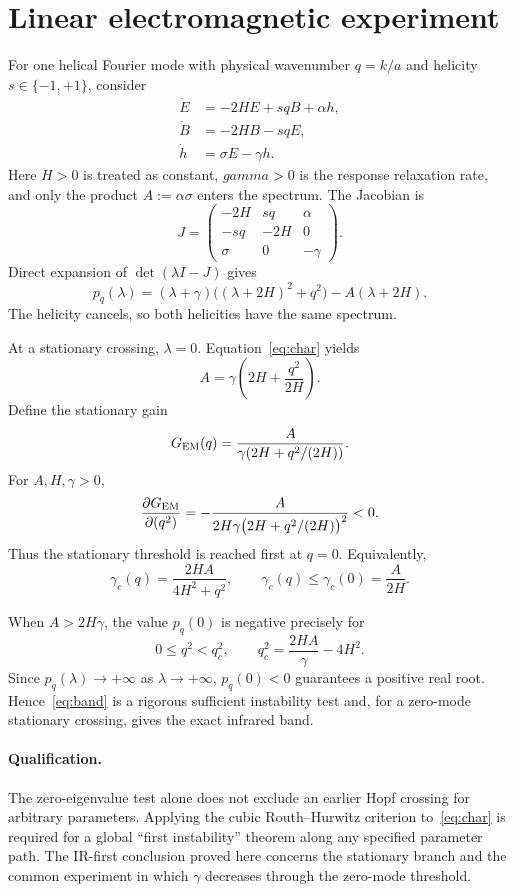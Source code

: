 \documentclass[11pt]{article}
\begin{document}
\section{Linear electromagnetic experiment}

For one helical Fourier mode with physical wavenumber $q=k/a$ and helicity $s\in\{-1,+1\}$, consider
\begin{align}
 \dot E&=-2HE+s qB+\alpha h,\\
 \dot B&=-2HB-s qE,\\
 \dot h&=\sigma E-\gamma h.
\end{align}
Here $H>0$ is treated as constant, $gamma>0$ is the response relaxation rate, and only the product $A:=\alpha\sigma$ enters the spectrum.  The Jacobian is
\[
J=\begin{pmatrix}-2H&sq&\alpha\\-sq&-2H&0\\\sigma&0&-\gamma\end{pmatrix}.
\]
Direct expansion of $\det(\lambda I-J)$ gives
\begin{equation}\label{eq:char}
 p_q(\lambda)=(\lambda+\gamma)\bigl((\lambda+2H)^2+q^2\bigr)-A(\lambda+2H).
\end{equation}
The helicity cancels, so both helicities have the same spectrum.

At a stationary crossing, $\lambda=0$.  Equation~\eqref{eq:char} yields
\begin{equation}\label{eq:threshold}
 A=\gamma\left(2H+\frac{q^2}{2H}\right).
\end{equation}
Define the stationary gain
\[
G_{\rm EM}(q)=\frac{A}{\gamma(2H+q^2/(2H))}.
\]
For $A,H,\gamma>0$,
\[
\frac{\partial G_{\rm EM}}{\partial(q^2)}
=-\frac{A}{2H\gamma\bigl(2H+q^2/(2H)\bigr)^2}<0.
\]
Thus the stationary threshold is reached first at $q=0$.  Equivalently,
\[
\gamma_c(q)=\frac{2HA}{4H^2+q^2},\qquad
\gamma_c(q)\leq \gamma_c(0)=\frac{A}{2H}.
\]

When $A>2H\gamma$, the value $p_q(0)$ is negative precisely for
\begin{equation}\label{eq:band}
0\leq q^2<q_c^2,
\qquad q_c^2=\frac{2HA}{\gamma}-4H^2.
\end{equation}
Since $p_q(\lambda)\to+\infty$ as $\lambda\to+\infty$, $p_q(0)<0$ guarantees a positive real root.  Hence~\eqref{eq:band} is a rigorous sufficient instability test and, for a zero-mode stationary crossing, gives the exact infrared band.

\paragraph{Qualification.}
The zero-eigenvalue test alone does not exclude an earlier Hopf crossing for arbitrary parameters.  Applying the cubic Routh--Hurwitz criterion to~\eqref{eq:char} is required for a global ``first instability'' theorem along any specified parameter path.  The IR-first conclusion proved here concerns the stationary branch and the common experiment in which $\gamma$ decreases through the zero-mode threshold.
\end{document}
